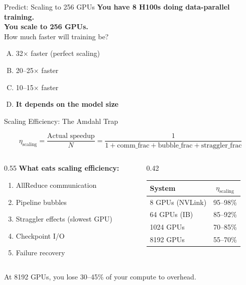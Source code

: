 \documentclass[aspectratio=169, 12pt]{beamer}
\begin{document}
\begin{frame}{Predict: Scaling to 256 GPUs}
\centering
\Large
\textbf{You have 8 H100s doing data-parallel training.}\\[0.5cm]
\textbf{You scale to 256 GPUs.}\\[0.5cm]
\normalsize
How much faster will training be?\\[0.3cm]
\begin{enumerate}[(A)]
  \item 32$\times$ faster (perfect scaling)
  \item 20--25$\times$ faster
  \item 10--15$\times$ faster
  \item \textbf{It depends on the model size}
\end{enumerate}
\end{frame}

\begin{frame}{Scaling Efficiency: The Amdahl Trap}

\small
\[
  \eta_{\text{scaling}} = \frac{\text{Actual speedup}}{N}
  = \frac{1}{1 + \text{comm\_frac} + \text{bubble\_frac} + \text{straggler\_frac}}
\]

\vspace{0.3cm}
\begin{columns}[T]
\begin{column}{0.55\textwidth}
\textbf{What eats scaling efficiency:}
\begin{enumerate}\setlength\itemsep{2pt}
  \item AllReduce communication
  \item Pipeline bubbles
  \item Straggler effects (slowest GPU)
  \item Checkpoint I/O
  \item Failure recovery
\end{enumerate}
\end{column}
\begin{column}{0.42\textwidth}
\centering
\scriptsize
\begin{tabular}{lc}
\toprule
\textbf{System} & $\eta_{\text{scaling}}$ \\
\midrule
8 GPUs (NVLink)  & 95--98\% \\
64 GPUs (IB)     & 85--92\% \\
1024 GPUs        & 70--85\% \\
8192 GPUs        & 55--70\% \\
\bottomrule
\end{tabular}
\end{column}
\end{columns}

\vspace{0.3cm}
\alert{At 8192 GPUs, you lose 30--45\% of your compute to overhead.}
\end{frame}
\end{document}
